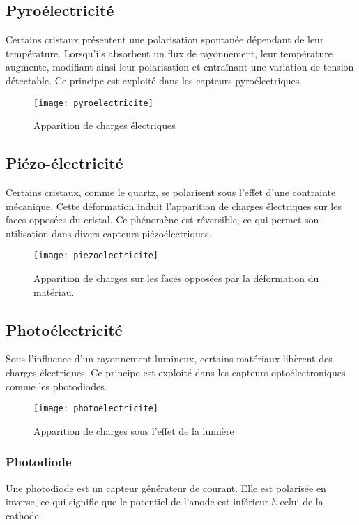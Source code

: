 \subsection*{Pyroélectricité}
Certains cristaux présentent une polarisation spontanée dépendant de leur 
température. Lorsqu'ils absorbent un flux de rayonnement, leur température 
augmente, modifiant ainsi leur polarisation et entraînant une variation de 
tension détectable.  
Ce principe est exploité dans les capteurs pyroélectriques.

\begin{figure}[H]
    \centering
    \texttt{[image: pyroelectricite]}
    \caption{Apparition de charges électriques}
    \label{fig:pyroelectricite}
\end{figure}

\subsection*{Piézo-électricité}
Certains cristaux, comme le quartz, se polarisent sous l'effet d'une contrainte 
mécanique. Cette déformation induit l'apparition de charges électriques sur les 
faces opposées du cristal.  
Ce phénomène est réversible, ce qui permet son utilisation dans divers capteurs 
piézoélectriques.

\begin{figure}[H]
    \centering
    \texttt{[image: piezoelectricite]}
    \caption{Apparition de charges sur les faces opposées par la déformation du matériau. }
    \label{fig:piezoelectricite}
\end{figure}

\subsection*{Photoélectricité}
Sous l'influence d'un rayonnement lumineux, certains matériaux libèrent des 
charges électriques. Ce principe est exploité dans les capteurs optoélectroniques
comme les photodiodes.

\begin{figure}[H]
    \centering
    \texttt{[image: photoelectricite]}
    \caption{Apparition de charges sous l'effet de la lumière}
    \label{fig:photoelectricite}
\end{figure}

\subsubsection{Photodiode}
Une photodiode est un capteur générateur de courant. Elle est polarisée en 
inverse, ce qui signifie que le potentiel de l'anode est inférieur à celui de la 
cathode.  

